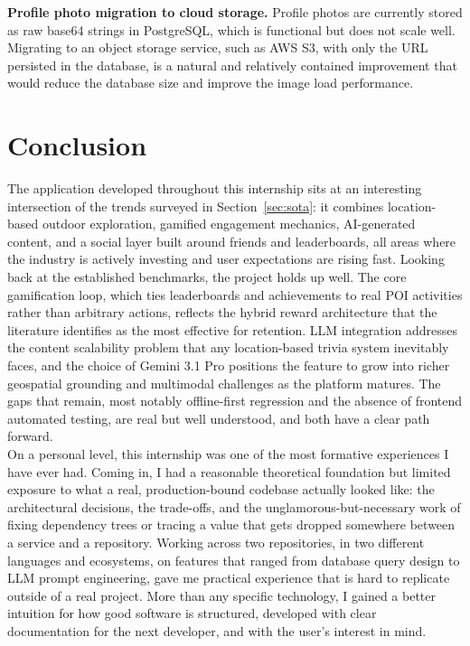 \documentclass[11pt,a4paper]{article}
\begin{document}
\textbf{Profile photo migration to cloud storage.}
Profile photos are currently stored as raw base64 strings in PostgreSQL, which is functional but does not scale well.
Migrating to an object storage service, such as AWS S3, with only the URL persisted in the database, is a natural and relatively contained improvement that would reduce the database size and improve the image load performance.

\vspace*{1cm}

\section{Conclusion}
\label{sec:conclusion}
 
The application developed throughout this internship sits at an interesting intersection of the trends surveyed in Section~\ref{sec:sota}: it combines location-based outdoor exploration, gamified engagement mechanics, AI-generated content, and a social layer built around friends and leaderboards, all areas where the industry is actively investing and user expectations are rising fast.
Looking back at the established benchmarks, the project holds up well.
The core gamification loop, which ties leaderboards and achievements to real POI activities rather than arbitrary actions, reflects the hybrid reward architecture that the literature identifies as the most effective for retention.
LLM integration addresses the content scalability problem that any location-based trivia system inevitably faces, and the choice of Gemini 3.1 Pro positions the feature to grow into richer geospatial grounding and multimodal challenges as the platform matures.
The gaps that remain, most notably offline-first regression and the absence of frontend automated testing, are real but well understood, and both have a clear path forward.\\
 
On a personal level, this internship was one of the most formative experiences I have ever had.
Coming in, I had a reasonable theoretical foundation but limited exposure to what a real, production-bound codebase actually looked like: the architectural decisions, the trade-offs, and the unglamorous-but-necessary work of fixing dependency trees or tracing a value that gets dropped somewhere between a service and a repository.
Working across two repositories, in two different languages and ecosystems, on features that ranged from database query design to LLM prompt engineering, gave me practical experience that is hard to replicate outside of a real project.
More than any specific technology, I gained a better intuition for how good software is structured, developed with clear documentation for the next developer, and with the user's interest in mind.

\newpage



\end{document}
